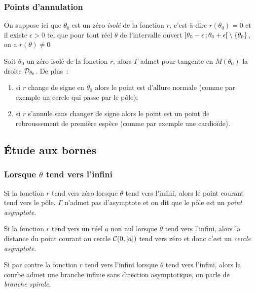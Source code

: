 \subsubsection{Points d'annulation}
On suppose ici que $\theta_0$ est un zéro \emph{isolé} de la fonction $r$, c'est-à-dire $r(\theta_0)=0$ et il existe $\epsilon >0$ tel que pour tout réel $\theta$ de l'intervalle ouvert $\left] \theta_0-\epsilon \, ;  \theta_0+\epsilon \right[\setminus\{\theta_0\}$, on a $r(\theta) \neq 0$

\begin{prop}[admise]
 Soit $\theta_0$ un zéro isolé de la fonction $r$, alors $\Gamma$ admet pour tangente en $M(\theta_0)$ la droite $\mathcal{D}_{\theta_0}$. De plus~:
 \begin{enumerate}
 \item si $r$ change de signe en $\theta_0$ alors le point est d'allure normale (comme par exemple un cercle qui passe par le pôle);
 \item si $r$ s'annule sans changer de signe alors le point est un point de rebroussement de première espèce (comme par exemple une cardioïde).
 \end{enumerate}
\end{prop}

\subsection{Étude aux bornes}
\subsubsection{Lorsque $\theta$ tend vers l'infini}
Si la fonction $r$ tend vers zéro lorsque $\theta$ tend vers l'infini, alors le point courant tend vers le pôle. $\Gamma$ n'admet pas d'asymptote et on dit que le pôle est un \emph{point asymptote}.

Si la fonction $r$ tend vers un réel $a$ non nul lorsque $\theta$ tend vers l'infini, alors la distance du point courant au cercle $\mathcal{C}(0,\left\lvert a\right\rvert)$ tend vers zéro et donc c'est un \emph{cercle asymptote}.

Si par contre la fonction $r$ tend vers l'infini lorsque $\theta$ tend vers l'infini, alors la courbe admet une branche infinie sans direction asymptotique, on parle de \emph{branche spirale}.

